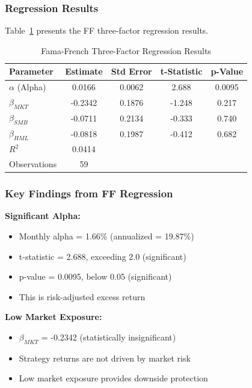 \subsubsection{Regression Results}

Table~\ref{tab:ff_results} presents the FF three-factor regression results.

\begin{table}[htbp]
\centering
\caption{Fama-French Three-Factor Regression Results}
\label{tab:ff_results}
\begin{tabular}{lcccc}
\hline
Parameter & Estimate & Std Error & t-Statistic & p-Value \\
\hline
$\alpha$ (Alpha) & 0.0166 & 0.0062 & 2.688 & 0.0095 \\
$\beta_{MKT}$ & -0.2342 & 0.1876 & -1.248 & 0.217 \\
$\beta_{SMB}$ & -0.0711 & 0.2134 & -0.333 & 0.740 \\
$\beta_{HML}$ & -0.0818 & 0.1987 & -0.412 & 0.682 \\
\hline
$R^2$ & 0.0414 & & & \\
Observations & 59 & & & \\
\hline
\end{tabular}
\end{table}

\subsubsection{Key Findings from FF Regression}

\textbf{Significant Alpha:}
\begin{itemize}
    \item Monthly alpha = 1.66\% (annualized = 19.87\%)
    \item t-statistic = 2.688, exceeding 2.0 (significant)
    \item p-value = 0.0095, below 0.05 (significant)
    \item This is risk-adjusted excess return
\end{itemize}

\textbf{Low Market Exposure:}
\begin{itemize}
    \item $\beta_{MKT}$ = -0.2342 (statistically insignificant)
    \item Strategy returns are not driven by market risk
    \item Low market exposure provides downside protection
\end{itemize}

